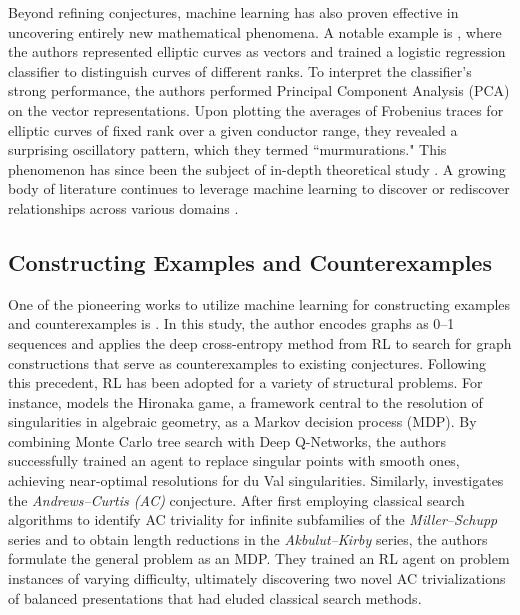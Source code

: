 \documentclass[11pt]{article}
\numberwithin{equation}{section}
\begin{document}
Beyond refining conjectures, machine learning has also proven effective in uncovering entirely new mathematical phenomena. A notable example is \cite{he2025murmurations}, where the authors represented elliptic curves as vectors and trained a logistic regression classifier to distinguish curves of different ranks. To interpret the classifier's strong performance, the authors performed Principal Component Analysis (PCA) on the vector representations. Upon plotting the averages of Frobenius traces for elliptic curves of fixed rank over a given conductor range, they revealed a surprising oscillatory pattern, which they termed ``murmurations." This phenomenon has since been the subject of in-depth theoretical study \cite{zubrilina2025murmurations,lee2025murmurations,bober2025murmurations}. A growing body of literature continues to leverage machine learning to discover or rediscover relationships across various domains \cite{carifio2017machine,KLAEWER2019438,PhysRevD.103.126014,doi:10.1142/S0217751X25500976,PhysRevD.105.066002,Lee01052025,doi:10.1142/S2810939223500016,PhysRevD.110.046016,shalyt2024unsupervised,lanard2025algorithm,lee2025machines}.





\subsection{Constructing Examples and Counterexamples}

One of the pioneering works to utilize machine learning for constructing examples and counterexamples is \cite{wagner2021constructions}. In this study, the author encodes graphs as 0--1 sequences and applies the deep cross-entropy method from RL to search for graph constructions that serve as counterexamples to existing conjectures. Following this precedent, RL has been adopted for a variety of structural problems. For instance, \cite{berczi2023ml} models the Hironaka game, a framework central to the resolution of singularities in algebraic geometry, as a Markov decision process (MDP). By combining Monte Carlo tree search with Deep Q-Networks, the authors successfully trained an agent to replace singular points with smooth ones, achieving near-optimal resolutions for du Val singularities. Similarly, \cite{shehper2025what} investigates the \textit{Andrews--Curtis (AC)} conjecture. After first employing classical search algorithms to identify AC triviality for infinite subfamilies of the \textit{Miller--Schupp} series and to obtain length reductions in the \textit{Akbulut--Kirby} series, the authors formulate the general problem as an MDP. They trained an RL agent on problem instances of varying difficulty, ultimately discovering two novel AC trivializations of balanced presentations that had eluded classical search methods.
\end{document}
